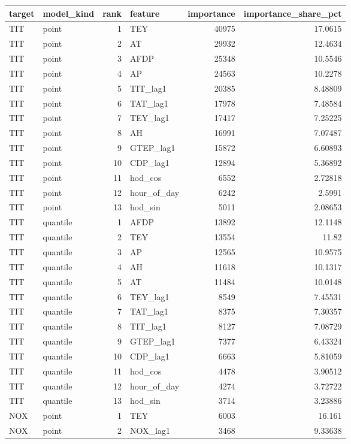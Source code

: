 \begin{tabular}{llrlrr}
\toprule
target & model\_kind & rank & feature & importance & importance\_share\_pct \\
\midrule
TIT & point & 1 & TEY & 40975 & 17.0615 \\
TIT & point & 2 & AT & 29932 & 12.4634 \\
TIT & point & 3 & AFDP & 25348 & 10.5546 \\
TIT & point & 4 & AP & 24563 & 10.2278 \\
TIT & point & 5 & TIT\_lag1 & 20385 & 8.48809 \\
TIT & point & 6 & TAT\_lag1 & 17978 & 7.48584 \\
TIT & point & 7 & TEY\_lag1 & 17417 & 7.25225 \\
TIT & point & 8 & AH & 16991 & 7.07487 \\
TIT & point & 9 & GTEP\_lag1 & 15872 & 6.60893 \\
TIT & point & 10 & CDP\_lag1 & 12894 & 5.36892 \\
TIT & point & 11 & hod\_cos & 6552 & 2.72818 \\
TIT & point & 12 & hour\_of\_day & 6242 & 2.5991 \\
TIT & point & 13 & hod\_sin & 5011 & 2.08653 \\
TIT & quantile & 1 & AFDP & 13892 & 12.1148 \\
TIT & quantile & 2 & TEY & 13554 & 11.82 \\
TIT & quantile & 3 & AP & 12565 & 10.9575 \\
TIT & quantile & 4 & AH & 11618 & 10.1317 \\
TIT & quantile & 5 & AT & 11484 & 10.0148 \\
TIT & quantile & 6 & TEY\_lag1 & 8549 & 7.45531 \\
TIT & quantile & 7 & TAT\_lag1 & 8375 & 7.30357 \\
TIT & quantile & 8 & TIT\_lag1 & 8127 & 7.08729 \\
TIT & quantile & 9 & GTEP\_lag1 & 7377 & 6.43324 \\
TIT & quantile & 10 & CDP\_lag1 & 6663 & 5.81059 \\
TIT & quantile & 11 & hod\_cos & 4478 & 3.90512 \\
TIT & quantile & 12 & hour\_of\_day & 4274 & 3.72722 \\
TIT & quantile & 13 & hod\_sin & 3714 & 3.23886 \\
NOX & point & 1 & TEY & 6003 & 16.161 \\
NOX & point & 2 & NOX\_lag1 & 3468 & 9.33638 \\

\end{tabular}

